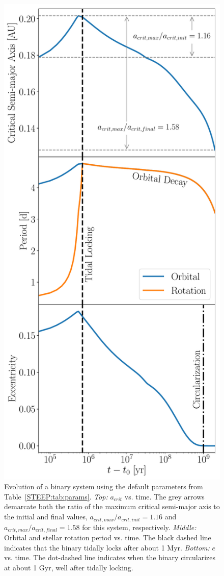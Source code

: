 \begin{figure}
	\includegraphics[scale=0.5]{example.pdf}
   \caption{Evolution of a binary system using the default parameters from Table~\ref{STEEP:tab:params}.  {\it Top:} $a_{crit}$ vs. time.  The grey arrows demarcate both the ratio of the maximum critical semi-major axis to the initial and final values, $a_{crit,max}/a_{crit,init} = 1.16$ and $a_{crit,max}/a_{crit,final} = 1.58$ for this system, respectively. {\it Middle:} Orbital and stellar rotation period vs. time.  The black dashed line indicates that the binary tidally locks after about 1 Myr.  {\it Bottom:} $e$ vs. time.  The dot-dashed line indicates when the binary circularizes at about 1 Gyr, well after tidally locking.}
    \label{STEEP:fig:example}
\end{figure}

